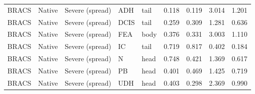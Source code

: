\begin{longtable}{lllllrrrr}
BRACS & Native & Severe (spread) & ADH & tail & 0.118 & 0.119 & 3.014 & 1.201 \\
BRACS & Native & Severe (spread) & DCIS & tail & 0.259 & 0.309 & 1.281 & 0.636 \\
BRACS & Native & Severe (spread) & FEA & body & 0.376 & 0.331 & 3.003 & 1.110 \\
BRACS & Native & Severe (spread) & IC & tail & 0.719 & 0.817 & 0.402 & 0.184 \\
BRACS & Native & Severe (spread) & N & head & 0.748 & 0.421 & 1.369 & 0.617 \\
BRACS & Native & Severe (spread) & PB & head & 0.401 & 0.469 & 1.425 & 0.719 \\
BRACS & Native & Severe (spread) & UDH & head & 0.403 & 0.298 & 2.369 & 0.990 \\
\end{longtable}
